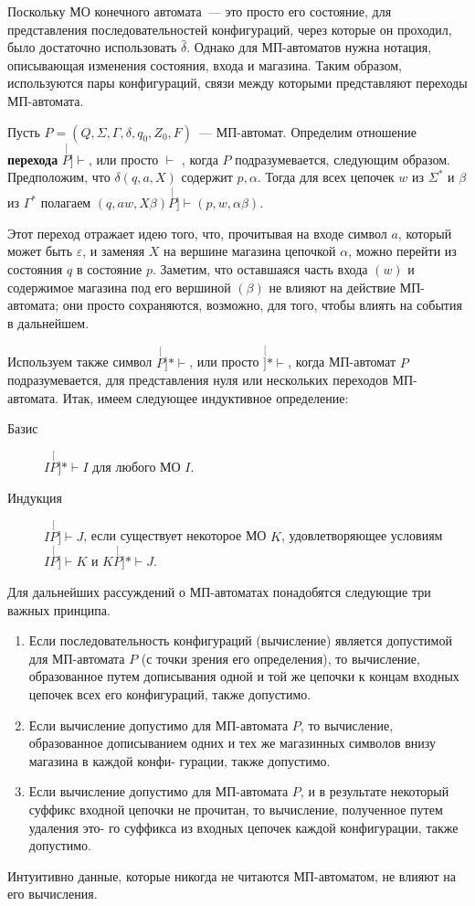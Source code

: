 \documentclass[a4paper,12pt]{article}
\begin{document}
	Поскольку МО конечного автомата~--- это просто его состояние, для представления последовательностей конфигураций, через которые он проходил, было достаточно использовать $\hat{\delta}$. Однако для МП-автоматов нужна нотация, описывающая изменения состояния, входа и магазина. Таким образом, используются пары конфигураций, связи между которыми представляют переходы МП-автомата.

	Пусть $P = (Q, \Sigma, \Gamma, \delta, q_0, Z_0, F)$~--- МП-автомат. Определим отношение \textbf{перехода} $\stackrel[P]{}{\vdash}$, или просто $\vdash$ , когда $P$ подразумевается, следующим образом. Предположим, что $\delta(q, a, X)$ содержит $p, \alpha$. Тогда для всех цепочек $w$ из $\Sigma^*$ и $\beta$ из $\Gamma^*$ полагаем $(q, aw, X\beta) \stackrel[P]{}{\vdash} (p, w, \alpha \beta)$.
	
	Этот переход отражает идею того, что, прочитывая на входе символ $a$, который может быть $\varepsilon$, и заменяя $X$ на вершине магазина цепочкой $\alpha$, можно перейти из состояния $q$ в состояние $p$. Заметим, что оставшаяся часть входа $(w)$ и содержимое магазина под его вершиной $(\beta)$ не влияют на действие МП-автомата; они просто сохраняются, возможно, для того, чтобы влиять на события в дальнейшем.
	
	Используем также символ $\stackrel[P]{*}{\vdash}$, или просто $\stackrel[]{*}{\vdash}$, когда МП-автомат $P$ подразумевается, для представления нуля или нескольких переходов МП-автомата. Итак, имеем следующее индуктивное определение:
	\begin{description}
		\item[Базис] $I \stackrel[P]{*}{\vdash} I$ для любого МО $I$.
		\item[Индукция] $I \stackrel[P]{}{\vdash} J$, если существует некоторое МО $K$, удовлетворяющее условиям $I \stackrel[P]{}{\vdash} K$ и $K \stackrel[P]{*}{\vdash} J$.
	\end{description}

	Для дальнейших рассуждений о МП-автоматах понадобятся следующие три важных принципа.
	\begin{enumerate}
		\item Если последовательность конфигураций (вычисление) является допустимой для МП-автомата $P$ (с точки зрения его определения), то вычисление, образованное путем дописывания одной и той же цепочки к концам входных цепочек всех его конфигураций, также допустимо.
		\item Если вычисление допустимо для МП-автомата $P$, то вычисление, образованное дописыванием одних и тех же магазинных символов внизу магазина в каждой конфи- гурации, также допустимо.
		\item Если вычисление допустимо для МП-автомата $P$, и в результате некоторый суффикс входной цепочки не прочитан, то вычисление, полученное путем удаления это- го суффикса из входных цепочек каждой конфигурации, также допустимо.
	\end{enumerate}
Интуитивно данные, которые никогда не читаются МП-автоматом, не влияют на его вычисления.
\end{document}
